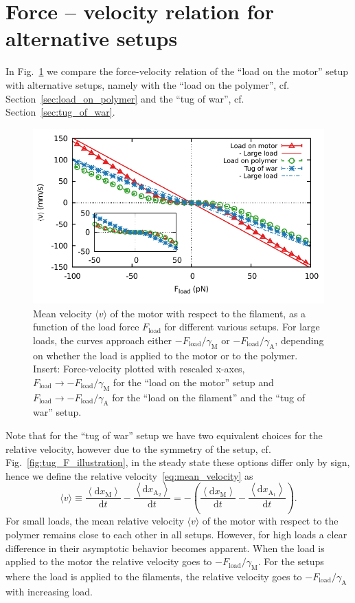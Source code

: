 \documentclass[aps,pre,twocolumn,showpacs,showkeys,superscriptaddress,floatfix]{revtex4-1}
\newcommand{\rmd}{{\mathrm d}}
\begin{document}
\appendix 
\section{Force -- velocity relation for alternative setups}
\label{sec:force_velocity_other}
In Fig.~\ref{fig:F_v_setups} we compare the force-velocity relation of the ``load on the motor'' setup with alternative setups,
namely with the ``load on the polymer'', cf. Section~\ref{sec:load_on_polymer} and the ``tug of war'', cf. Section~\ref{sec:tug_of_war}.
\begin{figure}[t]
\centering
\includegraphics[width=0.9\linewidth,height=!]{F_v_setups}
\caption{
\label{fig:F_v_setups} 
Mean velocity $\langle v \rangle$ of the motor with respect to the filament, as a function of the load force $F_\text{load}$ for different various setups.
For large loads, the curves approach either  $ - F_\text{load} / \gamma_\text{M}$ or $ - F_\text{load} / \gamma_\text{A}$, depending on whether the load is applied to the motor or to the polymer. 
Insert: Force-velocity plotted with rescaled x-axes,
$F_\text{load} \to - F_\text{load} / \gamma_\text{M}$ for the ``load on the motor'' setup 
and $F_\text{load} \to - F_\text{load} / \gamma_\text{A}$ for the ``load on the filament'' and the ``tug of war'' setup. 
}
\end{figure}
Note that for the ``tug of war'' setup we have two equivalent choices for the relative velocity,
however due to the symmetry of the setup, cf. Fig.~\ref{fig:tug_F_illustration}, in the steady state these options differ only by sign, 
hence we define the relative velocity~\eqref{eq:mean_velocity} as 
\[
\langle v \rangle 
\equiv \frac{ \left\langle \rmd x_\text{M} \right\rangle }{ \rmd t }
- \frac{ \left\langle \rmd x_{\text{A}_2} \right\rangle }{ \rmd t }
= - \left( \frac{ \left\langle \rmd x_\text{M} \right\rangle }{ \rmd t }
- \frac{ \left\langle \rmd x_{\text{A}_1} \right\rangle }{ \rmd t } \right) .
\]
For small loads, the mean relative velocity $\langle v \rangle$ of the motor with respect to the polymer remains close to each other in all setups.
However, for high loads a clear difference in their asymptotic behavior becomes apparent.
When the load is applied to the motor the relative velocity goes to $ - F_\text{load} / \gamma_\text{M}$.
For the setups where the load is applied to the filaments, the relative velocity goes to $ - F_\text{load} / \gamma_\text{A}$ with increasing load.
\end{document}

